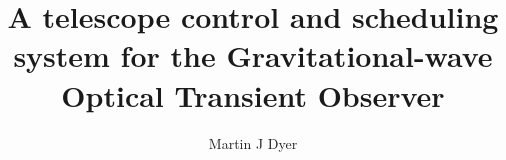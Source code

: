 \documentclass[a4paper,12pt,twoside,openright,nohints]{report} %
\begin{document}
\title{A telescope control and scheduling system for the Gravitational-wave Optical Transient Observer}
\author{Martin J Dyer}

\singlespacing{}
\pagestyle{empty}



\doublespacing{}
\pagestyle{plain}








\cleardoublepage{}
\pagestyle{fancy}











\pagestyle{plain}


%

%
\end{document}

